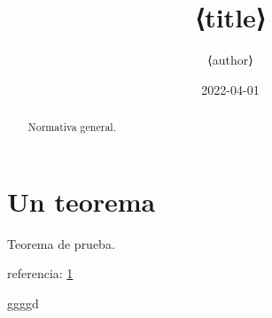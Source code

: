 \documentclass{article}
\begin{document}
\title{⟨title⟩}
\author{⟨author⟩}
\date{2022-04-01}
\maketitle
\makeHeader
\thispagestyle{fancy}
\begin{abstract}
    Normativa general.
\end{abstract}

\section{Un teorema}
\label{thm:abc}
Teorema de prueba.

referencia: \ref{thm:abc}

ggggd
\end{document}

